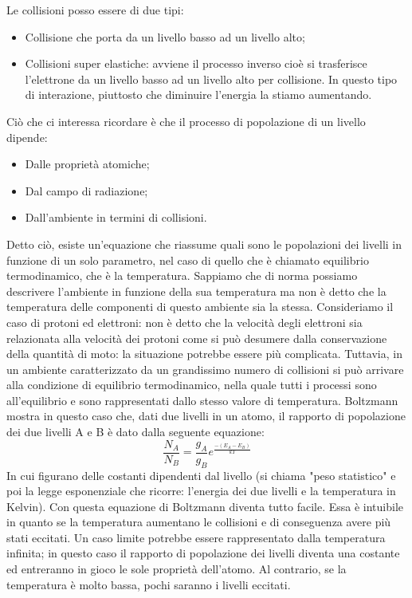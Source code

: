 \documentclass[a4paper,11pt]{article}
\begin{document}
    Le collisioni posso essere di due tipi:
     \begin {itemize}
            \item Collisione che porta da un livello basso ad un livello alto;
            \item Collisioni super elastiche: avviene il processo inverso cioè si trasferisce l'elettrone da un livello basso ad un livello alto per collisione. In questo tipo di interazione, piuttosto che diminuire l'energia la stiamo aumentando.
    \end{itemize}
    Ciò che ci interessa ricordare è che il processo di popolazione di un livello dipende:
    
     \begin {itemize}
            \item Dalle proprietà atomiche;
            \item Dal campo di radiazione;
            \item Dall'ambiente in termini di collisioni.
    \end{itemize}

    Detto ciò, esiste un'equazione che riassume quali sono le popolazioni dei livelli in funzione di un solo parametro, nel caso di quello che è chiamato equilibrio termodinamico, che è la temperatura. Sappiamo che di norma possiamo descrivere l'ambiente in funzione della sua temperatura ma non è detto che la temperatura delle componenti di questo ambiente sia la stessa. Consideriamo il caso di protoni ed elettroni: non è detto che la velocità degli elettroni sia relazionata alla velocità dei protoni come si può desumere dalla conservazione della quantità di moto: la situazione potrebbe essere più complicata. Tuttavia, in un ambiente caratterizzato da un grandissimo numero di collisioni si può arrivare alla condizione di equilibrio termodinamico, nella quale tutti i processi sono all'equilibrio e sono rappresentati dallo stesso valore di temperatura. Boltzmann mostra in questo caso che, dati due livelli in un atomo, il rapporto di popolazione dei due livelli A e B è dato dalla seguente equazione: 
    $$
        \frac{N_A}{N_B} = \frac{g_A}{g_B} e^{\frac{-(E_A-E_B)}{kT}}
    $$
    In cui figurano delle costanti dipendenti dal livello (si chiama "peso statistico" e poi la legge esponenziale che ricorre: l'energia dei due livelli e la temperatura in Kelvin). Con questa equazione di Boltzmann diventa tutto facile. Essa è intuibile in quanto se la temperatura aumentano le collisioni e di conseguenza avere più stati eccitati. Un caso limite potrebbe essere rappresentato dalla temperatura infinita; in questo caso il rapporto di popolazione dei livelli diventa una costante ed entreranno in gioco le sole proprietà dell'atomo. Al contrario, se la temperatura è molto bassa, pochi saranno i livelli eccitati. 
\end{document}
